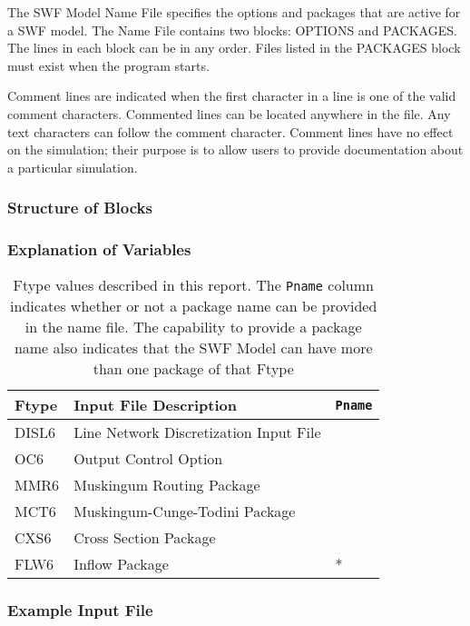 The SWF Model Name File specifies the options and packages that are active for a SWF model.  The Name File contains two blocks: OPTIONS  and PACKAGES. The lines in each block can be in any order.  Files listed in the PACKAGES block must exist when the program starts. 

Comment lines are indicated when the first character in a line is one of the valid comment characters.  Commented lines can be located anywhere in the file. Any text characters can follow the comment character. Comment lines have no effect on the simulation; their purpose is to allow users to provide documentation about a particular simulation. 

\vspace{5mm}
\subsubsection{Structure of Blocks}
%
%

\vspace{5mm}
\subsubsection{Explanation of Variables}
%

\begin{table}[H]
\caption{Ftype values described in this report.  The \texttt{Pname} column indicates whether or not a package name can be provided in the name file.  The capability to provide a package name also indicates that the SWF Model can have more than one package of that Ftype}
\small
\begin{center}
\begin{tabular*}{\columnwidth}{l l l}
\hline
\hline
Ftype & Input File Description & \texttt{Pname}\\
\hline
DISL6 & Line Network Discretization Input File \\
OC6 & Output Control Option \\
MMR6 & Muskingum Routing Package \\ 
MCT6 & Muskingum-Cunge-Todini Package \\ 
CXS6 & Cross Section Package \\ 
FLW6 & Inflow Package & * \\ 
\hline 
\end{tabular*}
\label{table:ftype}
\end{center}
\normalsize
\end{table}

\vspace{5mm}
\subsubsection{Example Input File}
%

